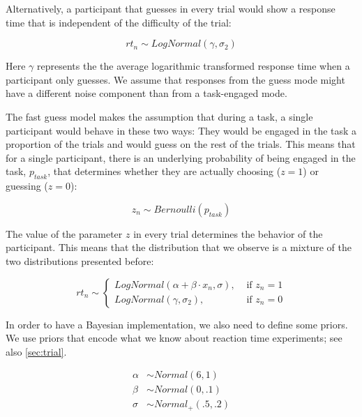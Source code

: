 \documentclass[12pt,]{krantz}
\theoremstyle{definition}
\theoremstyle{definition}
\theoremstyle{definition}
\theoremstyle{remark}
\begin{document}
Alternatively, a participant that guesses in every trial would show a
response time that is independent of the difficulty of the trial:

\begin{equation}
rt_n \sim LogNormal(\gamma, \sigma_2)
\end{equation}

Here \(\gamma\) represents the the average logarithmic transformed
response time when a participant only guesses. We assume that responses
from the guess mode might have a different noise component than from a
task-engaged mode.

The fast guess model makes the assumption that during a task, a single
participant would behave in these two ways: They would be engaged in the
task a proportion of the trials and would guess on the rest of the
trials. This means that for a single participant, there is an underlying
probability of being engaged in the task, \(p_{task}\), that determines
whether they are actually choosing (\(z=1\)) or guessing (\(z=0\)):

\begin{equation}
z_n \sim Bernoulli(p_{task})
\end{equation}

The value of the parameter \(z\) in every trial determines the behavior
of the participant. This means that the distribution that we observe is
a mixture of the two distributions presented before:

\begin{equation}
rt_n \sim 
\begin{cases}
LogNormal(\alpha + \beta \cdot x_n, \sigma), & \text{ if } z_n =1 \\
LogNormal(\gamma, \sigma_2), & \text{ if } z_n=0
\end{cases}
\label{eq:dismix}
\end{equation}

In order to have a Bayesian implementation, we also need to define some
priors. We use priors that encode what we know about reaction time
experiments; see also \ref{sec:trial}.

\begin{equation}
\begin{aligned}
\alpha &\sim Normal(6, 1)\\
\beta &\sim Normal(0, .1)\\
\sigma &\sim Normal_+(.5, .2)
\end{aligned}
\end{equation}
\end{document}
